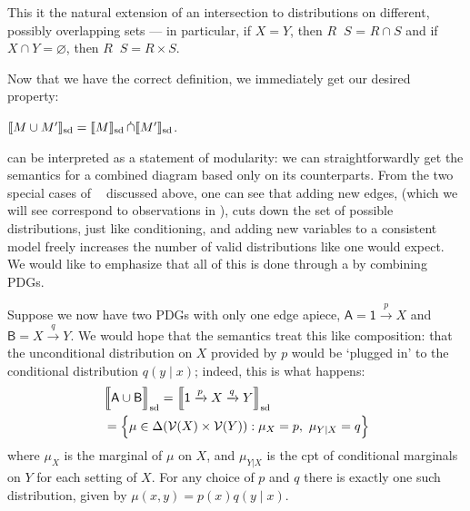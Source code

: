 \documentclass{article}
\newcommand{\notation}[2][]{#1}
\renewcommand{\notation}[2][]{{\color{notationcolor} #2}}
\DeclarePairedDelimiter{\SD}{\llbracket}{\rrbracket_{\text{sd}}}
\DeclareMathOperator\dcap{\mathop{\dot\cap}}
\newcommand{\V}{\mathcal V}
\newcommand{\MN}{PDG}
\newcommand{\MNs}{\MN s}
\numberwithin{equation}{section}
\begin{document}
\begin{vfull}
\begin{defn}[$\dcap$]
		This it the natural extension of an intersection to distributions on different, possibly overlapping sets --- in particular, if $X = Y$, then $R \dcap S$ = $R \cap S$ and if \notation[$X$ and $Y$ are disjoint]{$X \cap Y = \varnothing$}, then $R \dcap S = R \times S$. 
	\end{defn}
	
	
	Now that we have the correct definition, we immediately get our desired property:
	
	\begin{prop}\label{prop:union-set-semantics}
		$\SD{M \cup M'} = \SD{M} \dcap \SD{M'}$.
	\end{prop}

	 can be interpreted as a statement of modularity: we can straightforwardly get the semantics for a combined diagram based only on its counterparts. 
	From the two special cases of $\dcap$ discussed above, one can see that adding new edges, (which we will see correspond to observations in ), cuts down the set of possible distributions, just like conditioning, and adding new variables to a consistent model freely increases the number of valid distributions like one would expect. We would like to emphasize that all of this is done through a by combining \MNs.
	
	\begin{example}\label{ex:sd-compose-unconditional}
		Suppose we now have two PDGs with only one edge apiece, $\mathsf A = {\mathsf 1} \xrightarrow{p} X$ and $\mathsf B = X \xrightarrow{q} Y$. We would hope that the semantics treat this like composition: that the unconditional distribution on $X$ provided by $p$ would be `plugged in' to the conditional distribution $q(y \mid x)$; indeed, this is what happens:
		\begin{align*}
			&\SD[\Big]{{\sf A \cup B}} = \SD[\Big]{{\mathsf 1} \xrightarrow{p} X \xrightarrow{q} Y} \\
				&= \Big\{  \mu \in \Delta(\V(X) \times \V(Y)) : \mu_X = p,~\mu_{Y|X} = q \Big\} 
		\end{align*}
		where $\mu_X$ is the marginal of $\mu$ on $X$, and $\mu_{Y|X}$ is the cpt of conditional marginals on $Y$ for each setting of $X$.
		For any choice of $p$ and $q$ there is exactly one such distribution, given by $\mu(x,y) = p(x) q(y \mid x)$.
	\end{example}



\end{vfull}
\end{document}
